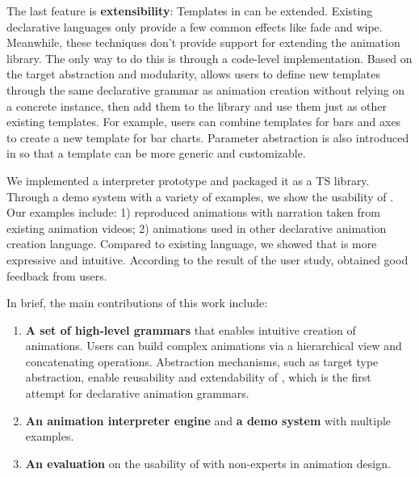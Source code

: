 The last feature is \textbf{extensibility}: Templates in \gaia{} can be extended.
Existing declarative languages only provide a few common effects like fade and wipe.
Meanwhile, these techniques don’t provide support for extending the animation library. The only way to do this is through a code-level implementation.
Based on the target abstraction and modularity, \gaia{} allows users to define new templates through the same declarative grammar as animation creation without relying on a concrete instance, then add them to the library and use them just as other existing templates. 
For example, users can combine templates for bars and axes to create a new template for bar charts. 
Parameter abstraction is also introduced in \gaia{} so that a template can be more generic and customizable.

We implemented a \gaia{} interpreter prototype and packaged it as a TS library.
Through a demo system with a variety of examples, we show the usability of \gaia{}. Our examples include: 1) reproduced animations with narration taken from existing animation videos; 2) animations used in other declarative animation creation language.
Compared to existing language, we showed that \gaia{} is more expressive and intuitive.
According to the result of the user study, \gaia{} obtained good feedback from users.

In brief, the main contributions of this work include:
\begin{enumerate}
\item \textbf{A set of high-level grammars} that enables intuitive creation of animations. 
Users can build complex animations via a hierarchical view and concatenating operations. 
Abstraction mechanisms, such as target type abstraction, enable reusability and extendability of \gaia{}, which is the first attempt for declarative animation grammars.
\item \textbf{An animation interpreter engine} and \textbf{a demo system} with multiple examples.
\item \textbf{An evaluation} on the usability of \gaia{} with non-experts in animation design.
\end{enumerate}